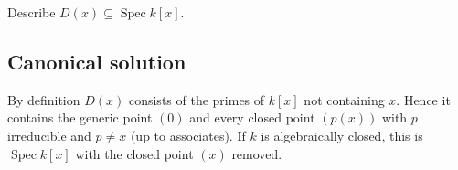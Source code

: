 
\begin{exercise}
	Describe \(D(x)\subseteq \operatorname{Spec} k[x]\).
\end{exercise}

\subsection*{Canonical solution}
By definition $D(x)$ consists of the primes of $k[x]$ not containing $x$. Hence it contains the generic point $(0)$ and every closed point $(p(x))$ with $p$ irreducible and $p\neq x$ (up to associates). If $k$ is algebraically closed, this is $\operatorname{Spec} k[x]$ with the closed point $(x)$ removed.
